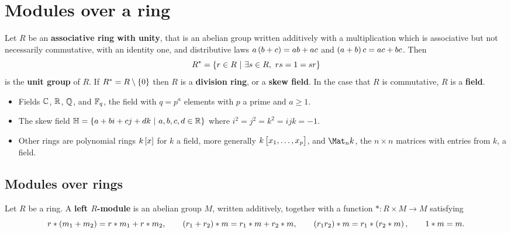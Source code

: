





\setcounter{section}{0}

\section{Modules over a ring}


Let $ R $ be an \textbf{associative ring with unity}, that is an abelian group written additively with a multiplication which is associative but not necessarily commutative, with an identity one, and distributive laws $ a\br{b + c} = ab + ac $ and $ \br{a + b}c = ac + bc $. Then
$$ R^* = \cbr{r \in R \st \exists s \in R, \ rs = 1 = sr} $$
is the \textbf{unit group} of $ R $. If $ R^* = R \setminus \cbr{0} $ then $ R $ is a \textbf{division ring}, or a \textbf{skew field}. In the case that $ R $ is commutative, $ R $ is a \textbf{field}.

\begin{example*}
\hfill
\begin{itemize}
\item Fields $ \mathbb{C} $, $ \mathbb{R} $, $ \mathbb{Q} $, and $ \mathbb{F}_q $, the field with $ q = p^a $ elements with $ p $ a prime and $ a \ge 1 $.
\item The skew field $ \HH = \cbr{a + bi + cj + dk \st a, b, c, d \in \RR} $ where $ i^2 = j^2 = k^2 = ijk = -1 $.
\item Other rings are polynomial rings $ k\sbr{x} $ for $ k $ a field, more generally $ k\sbr{x_1, \dots, x_p} $, and $ \Mat_n k $, the $ n \times n $ matrices with entries from $ k $, a field.
\end{itemize}
\end{example*}

\subsection{Modules over rings}

\begin{definition}
Let $ R $ be a ring. A \textbf{left $ R $-module} is an abelian group $ M $, written additively, together with a function $ * : R \times M \to M $ satisfying
$$ r * \br{m_1 + m_2} = r * m_1 + r * m_2, \qquad \br{r_1 + r_2} * m = r_1 * m + r_2 * m, \qquad \br{r_1r_2} * m = r_1 * \br{r_2 * m}, \qquad 1 * m = m. $$
\end{definition}

